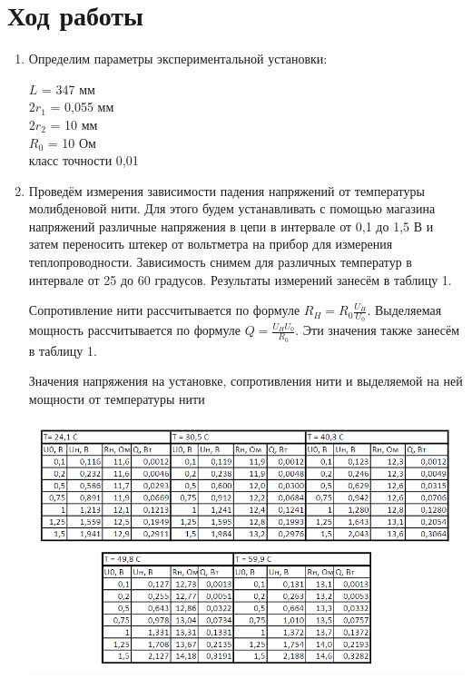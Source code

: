 \documentclass{article}
\begin{document}
 \section{Ход работы}
\begin{enumerate}
     \item Определим параметры экспериментальной установки:
     \begin{multicols}{2}
     $L$ = 347 мм\\
     $2r_1$ = 0,055 мм\\
     $2r_2$ = 10 мм\\
     $R_0$ = 10 Ом\\
     класс точности 0,01
     \end{multicols}
     
     \item Проведём измерения зависимости падения напряжений от температуры молибденовой нити. Для этого будем устанавливать с помощью магазина напряжений различные напряжения в цепи в интервале от 0,1 до 1,5 В и затем переносить штекер от вольтметра на прибор для измерения теплопроводности. Зависимость снимем для различных температур в интервале от 25 до 60 градусов. Результаты измерений занесём в таблицу 1. \par
     Сопротивление нити рассчитывается по формуле $R_H = R_0 \frac{U_H}{U_0}$. Выделяемая мощность рассчитывается по формуле $Q = \frac{U_H U_0}{R_0}$. Эти значения также занесём в таблицу 1.
     
     \begin{table}[t]
    \centering
    \caption{Значения напряжения на установке, сопротивления нити и выделяемой на ней мощности от температуры нити}
    \includegraphics[width=\textwidth]{table1.PNG}
    \label{fig:vac}
    \end{table}
     

\end{enumerate}
\end{document}
